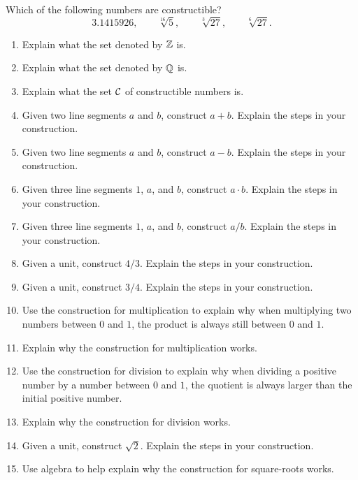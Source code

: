 \begin{question} Which of the following numbers are constructible?
\[
3.1415926, \qquad \sqrt[16]{5}, \qquad \sqrt[3]{27}, \qquad \sqrt[6]{27}.
\]
\end{question}
\QM



\begin{problems}
\begin{enumerate}
\item Explain what the set denoted by $\mathbb Z$ is.
\item Explain what the set denoted by $\mathbb Q$ is.
\item Explain what the set $\mathcal C$ of constructible numbers is.
\item Given two line segments $a$ and $b$, construct $a+b$. Explain
  the steps in your construction.
\item Given two line segments $a$ and $b$, construct $a-b$. Explain
  the steps in your construction.
\item Given three line segments $1$, $a$, and $b$, construct $a\cdot
  b$. Explain the steps in your construction.
\item Given three line segments $1$, $a$, and $b$, construct
  $a/b$. Explain the steps in your construction.
\item Given a unit, construct $4/3$. Explain the steps in your
  construction.
\item Given a unit, construct $3/4$. Explain the steps in your
  construction.
\item Use the construction for multiplication to explain why when
  multiplying two numbers between $0$ and $1$, the product is always
  still between $0$ and $1$.
\item Explain why the construction for multiplication works.
\item Use the construction for division to explain why when dividing a
  positive number by a number between $0$ and $1$, the quotient is
  always larger than the initial positive number.
\item Explain why the construction for division works.
\item Given a unit, construct $\sqrt{2}$. Explain the steps in your
  construction.
\item Use algebra to help explain why the construction for
  square-roots works.


\end{enumerate}
\end{problems}
